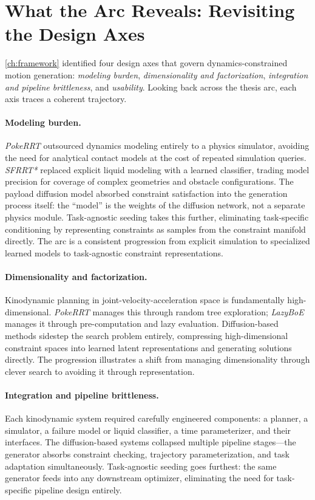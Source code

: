 





\section{What the Arc Reveals: Revisiting the Design Axes}
\label{sec:discussion:axes}

\cref{ch:framework} identified four design axes that govern dynamics-constrained motion generation: \textit{modeling burden}, \textit{dimensionality and factorization}, \textit{integration and pipeline brittleness}, and \textit{usability}.
Looking back across the thesis arc, each axis traces a coherent trajectory.

\paragraph{Modeling burden.}
\textit{PokeRRT} outsourced dynamics modeling entirely to a physics simulator, avoiding the need for analytical contact models at the cost of repeated simulation queries.
\textit{SFRRT*} replaced explicit liquid modeling with a learned classifier, trading model precision for coverage of complex geometries and obstacle configurations.
The payload diffusion model absorbed constraint satisfaction into the generation process itself: the ``model'' is the weights of the diffusion network, not a separate physics module.
Task-agnostic seeding takes this further, eliminating task-specific conditioning by representing constraints as samples from the constraint manifold directly.
The arc is a consistent progression from explicit simulation to specialized learned models to task-agnostic constraint representations.

\paragraph{Dimensionality and factorization.}
Kinodynamic planning in joint-velocity-acceleration space is fundamentally high-dimensional.
\textit{PokeRRT} manages this through random tree exploration; \textit{LazyBoE} manages it through pre-computation and lazy evaluation.
Diffusion-based methods sidestep the search problem entirely, compressing high-dimensional constraint spaces into learned latent representations and generating solutions directly.
The progression illustrates a shift from managing dimensionality through clever search to avoiding it through representation.

\paragraph{Integration and pipeline brittleness.}
Each kinodynamic system required carefully engineered components: a planner, a simulator, a failure model or liquid classifier, a time parameterizer, and their interfaces.
The diffusion-based systems collapsed multiple pipeline stages---the generator absorbs constraint checking, trajectory parameterization, and task adaptation simultaneously.
Task-agnostic seeding goes furthest: the same generator feeds into any downstream optimizer, eliminating the need for task-specific pipeline design entirely.

